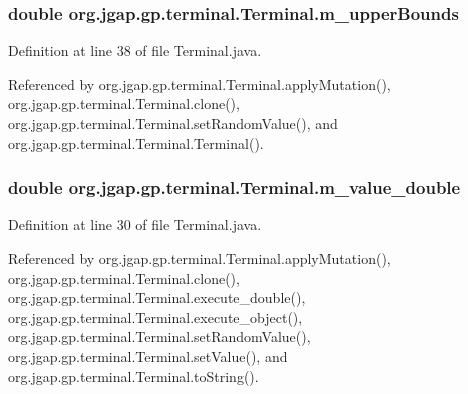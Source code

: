 \hypertarget{classorg_1_1jgap_1_1gp_1_1terminal_1_1_terminal_a8fc7ed948d76ce53152b5354cf02cf12}{
\subsubsection[{m\-\_\-upper\-Bounds}]{\setlength{\rightskip}{0pt plus 5cm}double org.\-jgap.\-gp.\-terminal.\-Terminal.\-m\-\_\-upper\-Bounds\hspace{0.3cm}{\ttfamily [private]}}}\label{classorg_1_1jgap_1_1gp_1_1terminal_1_1_terminal_a8fc7ed948d76ce53152b5354cf02cf12}


Definition at line 38 of file Terminal.\-java.



Referenced by org.\-jgap.\-gp.\-terminal.\-Terminal.\-apply\-Mutation(), org.\-jgap.\-gp.\-terminal.\-Terminal.\-clone(), org.\-jgap.\-gp.\-terminal.\-Terminal.\-set\-Random\-Value(), and org.\-jgap.\-gp.\-terminal.\-Terminal.\-Terminal().

\hypertarget{classorg_1_1jgap_1_1gp_1_1terminal_1_1_terminal_a8f05c32e1bfe23e4c3dcdbfdf47f14f2}{
\subsubsection[{m\-\_\-value\-\_\-double}]{\setlength{\rightskip}{0pt plus 5cm}double org.\-jgap.\-gp.\-terminal.\-Terminal.\-m\-\_\-value\-\_\-double\hspace{0.3cm}{\ttfamily [private]}}}\label{classorg_1_1jgap_1_1gp_1_1terminal_1_1_terminal_a8f05c32e1bfe23e4c3dcdbfdf47f14f2}


Definition at line 30 of file Terminal.\-java.



Referenced by org.\-jgap.\-gp.\-terminal.\-Terminal.\-apply\-Mutation(), org.\-jgap.\-gp.\-terminal.\-Terminal.\-clone(), org.\-jgap.\-gp.\-terminal.\-Terminal.\-execute\-\_\-double(), org.\-jgap.\-gp.\-terminal.\-Terminal.\-execute\-\_\-object(), org.\-jgap.\-gp.\-terminal.\-Terminal.\-set\-Random\-Value(), org.\-jgap.\-gp.\-terminal.\-Terminal.\-set\-Value(), and org.\-jgap.\-gp.\-terminal.\-Terminal.\-to\-String().

